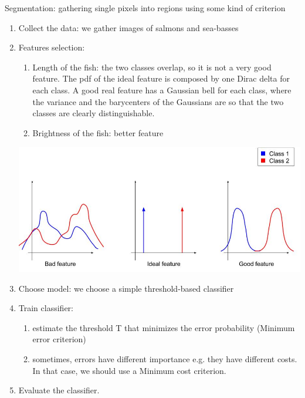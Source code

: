 \documentclass[oneside,onecolumn]{report}
\begin{document}
Segmentation: gathering single pixels into regions using some kind of criterion

\begin{enumerate}
    \item  Collect the data: we gather images of salmons and sea-basses

    \item  Features selection:
    \begin{enumerate}
        \item Length of the fish: the two classes overlap, so it is not a very good feature. The pdf of the ideal feature is composed by one Dirac delta for each class. A good real feature has a Gaussian bell for each class, where the variance and the barycenters of the Gaussians are so that the two classes are clearly distinguishable.
        \item Brightness of the fish: better feature
    \end{enumerate}
    \begin{center}
        \includegraphics[width=15cm]{bad_feature.jpg}
    \end{center}

    \item Choose model: we choose a simple threshold-based classifier

    \item Train classifier:
    \begin{enumerate}
        \item estimate the threshold T that minimizes the error probability (Minimum error criterion)
        \item sometimes, errors have different importance e.g. they have different costs. In that case, we should use a Minimum cost criterion.
    \end{enumerate}

    \item Evaluate the classifier.
\end{enumerate}
\end{document}
